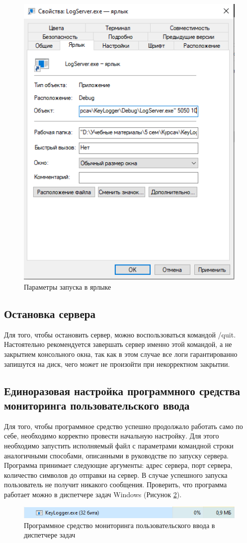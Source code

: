\begin{figure}[ht]
	\centering
	  \includegraphics[scale=1]{attachments/shortcut.png}  
	  \caption{ Параметры запуска в ярлыке }
	  \label{sec:user_guide:serverstart:shortcut}
\end{figure}

\subsection{Остановка сервера} 
\label{sec:user_guide:serverstop}

Для того, чтобы остановить сервер, можно воспользоваться командой /quit. Настоятельно рекомендуется завершать сервер именно этой командой, а не закрытием консольного окна, так как в этом случае все логи гарантированно запишутся на диск, чего может не произойти при некорректном закрытии. 

\subsection{Единоразовая настройка программного средства мониторинга пользовательского ввода} 
\label{sec:user_guide:keyloggersetup}

Для того, чтобы программное средство успешно продолжало работать само по себе, необходимо корректно провести начальную настройку. Для этого необходимо запустить исполняемый файл с параметрами командной строки аналогичными способами, описанными в руководстве по запуску сервера. Программа принимает следующие аргументы: адрес сервера, порт сервера, количество символов до отправки на сервер. В случае успешного запуска пользователь не получит никакого сообщения. Проверить, что программа работает можно в диспетчере задач Windows (Рисунок \ref*{sec:user_guide:keyloggersetup:keyloggertask}).

\begin{figure}[ht]
	\centering
	  \includegraphics[scale=0.9]{attachments/keyloggertask.png}  
	  \caption{ Программное средство мониторинга пользовательского ввода в диспетчере задач }
	  \label{sec:user_guide:keyloggersetup:keyloggertask}
\end{figure}
